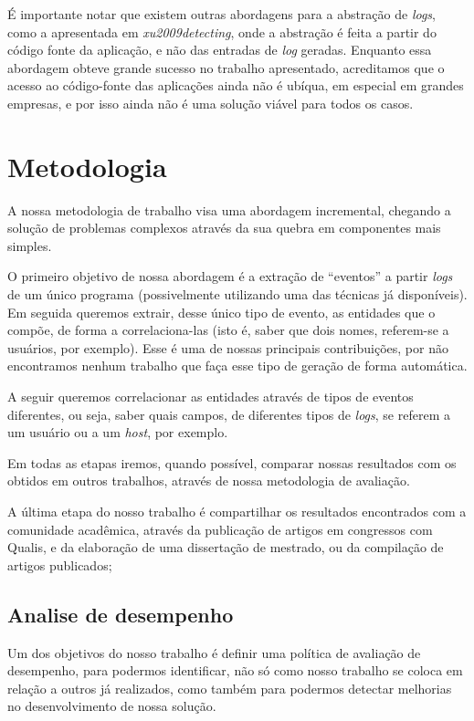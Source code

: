 \documentclass[
	12pt,				%
	openright,			%
	twoside,			%
	a4paper,			%
	english,			%
	spanish,			%
	brazil,				%
	]{abntex2}
\begin{document}
É importante notar que existem outras abordagens para a abstração de \emph{logs}, como a apresentada em \emph{xu2009detecting}, onde a abstração é feita a partir do código fonte da aplicação, e não das entradas de \emph{log} geradas. Enquanto essa abordagem obteve grande sucesso no trabalho apresentado, acreditamos que o acesso ao código-fonte das aplicações ainda não é ubíqua, em especial em grandes empresas, e por isso ainda não é uma solução viável para todos os casos. 

\section{Metodologia}

A nossa metodologia de trabalho visa uma abordagem incremental, chegando a solução de problemas complexos através da sua quebra em componentes mais simples.

O primeiro objetivo de nossa abordagem é a extração de ``eventos'' a partir \emph{logs} de um único programa (possivelmente utilizando uma das técnicas já disponíveis). Em seguida queremos extrair, desse único tipo de evento, as entidades que o compõe, de forma a correlaciona-las (isto é, saber que dois nomes, referem-se a usuários, por exemplo). Esse é uma de nossas principais contribuições, por não encontramos nenhum trabalho que faça esse tipo de geração de forma automática.

A seguir queremos correlacionar as entidades através de tipos de eventos diferentes, ou seja, saber quais campos, de diferentes tipos de \emph{logs}, se referem a um usuário ou a um \emph{host}, por exemplo.

Em todas as etapas iremos, quando possível, comparar nossas resultados com os obtidos em outros trabalhos, através de nossa metodologia de avaliação.

A última etapa do nosso trabalho é compartilhar os resultados encontrados com a comunidade acadêmica, através da publicação de artigos em congressos com Qualis, e  da elaboração de uma dissertação de mestrado, ou da compilação de artigos publicados;

\subsection{Analise de desempenho}

Um dos objetivos do nosso trabalho é definir uma política de avaliação de desempenho, para podermos identificar, não só como nosso trabalho se coloca em relação a outros já realizados, como também para podermos detectar melhorias no desenvolvimento de nossa solução.
\end{document}
